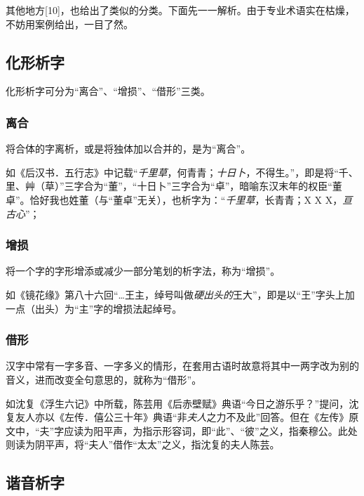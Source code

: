 \documentclass[]{article}
\begin{document}
其他地方{[}10{]}，也给出了类似的分类。下面先一一解析。由于专业术语实在枯燥，不妨用案例给出，一目了然。

\hypertarget{header-n272}{%
\subsection{化形析字}\label{header-n272}}

化形析字可分为``离合''、``增损''、``借形''三类。

\hypertarget{header-n276}{%
\subsubsection{离合}\label{header-n276}}

将合体的字离析，或是将独体加以合并的，是为``离合''。

如《后汉书．五行志》中记载``\emph{千里草}，何青青；\emph{十日卜}，不得生。''，即是将``千、里、艸（草）''三字合为``董''，``十日卜''三字合为``卓''，暗喻东汉末年的权臣``董卓''。恰好我也姓董（与``董卓''无关），也析字为：``\emph{千里草}，长青青；X
X X，\emph{亘古心}''；

\hypertarget{header-n278}{%
\subsubsection{增损}\label{header-n278}}

将一个字的字形增添或减少一部分笔划的析字法，称为``增损''。

如《镜花缘》第八十六回``\ldots{}王主，绰号叫做\emph{硬出头的}王大''，即是以``王''字头上加一点（出头）为``主''字的增损法起绰号。

\hypertarget{header-n456}{%
\subsubsection{借形}\label{header-n456}}

汉字中常有一字多音、一字多义的情形，在套用古语时故意将其中一两字改为别的音义，进而改变全句意思的，就称为``借形''。

如沈复《浮生六记》中所载，陈芸用《后赤壁赋》典语``今日之游乐乎？''提问，沈复友人亦以《左传．僖公三十年》典语``非\emph{夫人}之力不及此''回答。但在《左传》原文中，``夫''字应读为阳平声，为指示形容词，即``此''、``彼''之义，指秦穆公。此处则读为阴平声，将``夫人''借作``太太''之义，指沈复的夫人陈芸。

\hypertarget{header-n475}{%
\subsection{谐音析字}\label{header-n475}}
\end{document}
